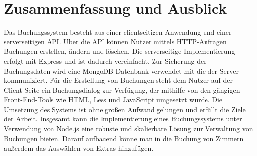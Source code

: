 \chapter{Zusammenfassung und Ausblick}
Das Buchungssystem besteht aus einer clientseitigen Anwendung und einer serverseitigen API. Über die API können Nutzer mittels HTTP-Anfragen Buchungen erstellen, ändern und löschen. Die serverseitige Implementierung erfolgt mit Express und ist dadurch vereinfacht. Zur Sicherung der Buchungsdaten wird eine MongoDB-Datenbank verwendet mit die der Server kommuniziert. Für die Erstellung von Buchungen steht dem Nutzer auf der Client-Seite ein Buchungsdialog zur Verfügung, der mithilfe von den gängigen Front-End-Tools wie HTML, Less und JavaScript umgesetzt wurde. Die Umsetzung des Systems ist ohne großen Aufwand gelungen und erfüllt die Ziele der Arbeit. Insgesamt kann die Implementierung eines Buchungssystems unter Verwendung von Node.js eine robuste und skalierbare Lösung zur Verwaltung von Buchungen bieten. Darauf aufbauend könne man in die Buchung von Zimmern außerdem das Auswählen von Extras hinzufügen.
